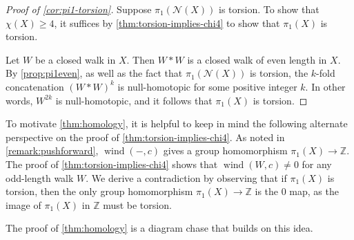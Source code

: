 \documentclass[12pt,letterpaper]{amsart}
\theoremstyle{definition}
\theoremstyle{remark}
\newcommand{\N}{{\mathcal N}}
\newcommand{\Z}{{\mathbb Z}}
\DeclareMathOperator{\wind}{wind}
\begin{document}
\begin{proof}[Proof of \cref{cor:pi1-torsion}]
Suppose $\pi_1(\N(X))$ is torsion. To show that $\chi(X)\geq 4$, it suffices by \cref{thm:torsion-implies-chi4} to show that $\pi_1(X)$ is torsion.

Let $W$ be a closed walk in $X$. Then $W*W$ is a closed walk of even length in $X$. By \cref{prop:pi1even}, as well as the fact that $\pi_1(\mathcal{N}(X))$ is torsion, the $k$-fold concatenation $(W*W)^k$ is null-homotopic for some positive integer $k$. In other words, $W^{2k}$ is null-homotopic, and it follows that $\pi_1(X)$ is torsion.
\end{proof}

To motivate \cref{thm:homology}, it is helpful to keep in mind the following alternate perspective on the proof of \cref{thm:torsion-implies-chi4}. As noted in \cref{remark:pushforward}, $\wind(-,c)$ gives a group homomorphism $\pi_1(X)\to\Z$. The proof of \cref{thm:torsion-implies-chi4} shows that $\wind(W,c)\neq 0$ for any odd-length walk $W$. We derive a contradiction by observing that if $\pi_1(X)$ is torsion, then the only group homomorphism $\pi_1(X)\to\Z$ is the 0 map, as the image of $\pi_1(X)$ in $\Z$ must be torsion.

The proof of \cref{thm:homology} is a diagram chase that builds on this idea.
\end{document}
